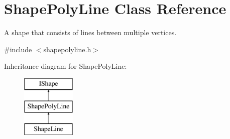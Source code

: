 \hypertarget{class_shape_poly_line}{}\section{Shape\+Poly\+Line Class Reference}
\label{class_shape_poly_line}


A shape that consists of lines between multiple vertices.  




{\ttfamily \#include $<$shapepolyline.\+h$>$}

Inheritance diagram for Shape\+Poly\+Line\+:\begin{figure}[H]
\begin{center}
\leavevmode
\includegraphics[height=3.000000cm]{class_shape_poly_line}
\end{center}
\end{figure}
